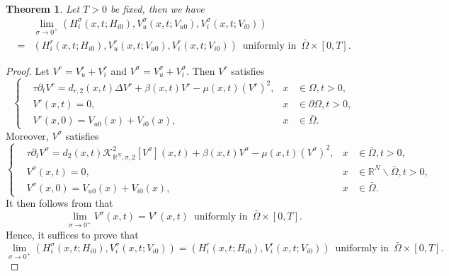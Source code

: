 \documentclass[11pt,reqno]{amsart}
\newtheorem{theorem}{Theorem}[section]
\numberwithin{equation}{section}
\begin{document}
\begin{theorem}\label{THM8.4}
Let $T>0$ be fixed, then we have
\begin{equation*}
\begin{aligned}
&\lim_{\sigma \to 0^{+}}
(H_{i}^{\sigma}(x,t;H_{i0}), V_{u}^{\sigma}(x,t;V_{u0}), V_{i}^{\sigma}(x,t;V_{i0}))\\
=&
(H_{i}^{r}(x,t;H_{i0}), V_{u}^{r}(x,t;V_{u0}), V_{i}^{r}(x,t;V_{i0}))\enspace \text{uniformly in}\enspace  \bar{\Omega}\times[0,T].
\end{aligned}
\end{equation*}
\end{theorem}
\begin{proof}
Let $V^{r} = V_{u}^{r} + V^{r}_{i}$ and $V^{\sigma} = V_{u}^{\sigma} + V^{\sigma}_{i}$. Then $V^{r}$ satisfies
\begin{equation*}
\left\{
\begin{aligned}
&\tau\partial_{t} V^{r} = d_{r,2}(x,t)\Delta V^{r} + \beta(x,t)V^{r} - \mu(x,t) (V^{r})^{2}, &x& \in\Omega,t>0,\\
&V^{r}(x,t) = 0, &x& \in\partial\Omega,t>0,\\
&V^{r}(x,0) = V_{u0}(x) + V_{i0}(x), &x&\in\bar\Omega.
\end{aligned}
\right.
\end{equation*}
Moreover, $V^{\sigma}$ satisfies
\begin{equation*}
\left\{
\begin{aligned}
&\tau\partial_{t} V^{\sigma} = d_{2}(x,t)\mathcal{K}^{2}_{\mathbb{R}^{N},\sigma,2} [V^{\sigma}](x,t) + \beta(x,t)V^{\sigma} - \mu(x,t) (V^{\sigma})^{2}, &x&\in\bar\Omega,t>0,\\
&V^{\sigma}(x,t) = 0, &x&\in \mathbb{R}^{N}\backslash\bar\Omega, t>0,\\
&V^{\sigma}(x,0) = V_{u0}(x) + V_{i0}(x), &x&\in\bar{\Omega}.
\end{aligned}
\right.
\end{equation*}
It then follows from \cite[Theorem A]{SX} that
\begin{equation}\label{4-9}
\lim_{\sigma \to 0^{+}} V^{\sigma}(x,t) = V^{r}(x,t)
\enspace \text{uniformly in}\enspace \bar{\Omega}\times[0,T].
\end{equation}
Hence, it suffices to prove that
\begin{equation*}
\lim_{\sigma \to 0^{+}}
(H_{i}^{\sigma}(x,t;H_{i0}),  V_{i}^{\sigma}(x,t;V_{i0}))
=
(H_{i}^{r}(x,t;H_{i0}),  V_{i}^{r}(x,t;V_{i0}))
\enspace \text{uniformly in}\enspace  \bar{\Omega}\times[0,T].

\end{equation*}
\end{proof}
\end{document}
